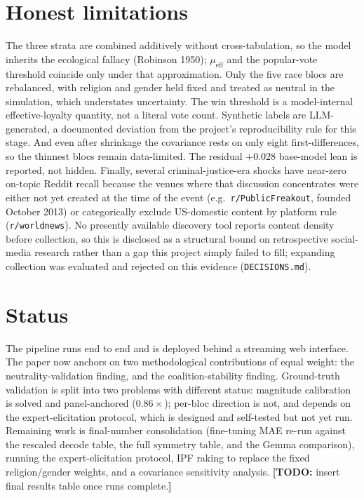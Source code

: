 \documentclass[11pt]{article}
\newcommand{\todo}[1]{{\color{red}\textbf{[TODO:} #1\textbf{]}}}
\begin{document}
\section*{Honest limitations}
The three strata are combined additively without cross-tabulation, so the model
inherits the ecological fallacy (Robinson 1950); $\mu_{\text{eff}}$ and the
popular-vote threshold coincide only under that approximation. Only the five race
blocs are rebalanced, with religion and gender held fixed and treated as neutral
in the simulation, which understates uncertainty. The win threshold is a
model-internal effective-loyalty quantity, not a literal vote count. Synthetic
labels are LLM-generated, a documented deviation from the project's
reproducibility rule for this stage. And even after shrinkage the covariance
rests on only eight first-differences, so the thinnest blocs remain data-limited.
The residual $+0.028$ base-model lean is reported, not hidden. Finally, several
criminal-justice-era shocks have near-zero on-topic Reddit recall because the
venues where that discussion concentrates were either not yet created at the
time of the event (e.g.\ \texttt{r/PublicFreakout}, founded October 2013) or
categorically exclude US-domestic content by platform rule (\texttt{r/worldnews}).
No presently available discovery tool reports content density before collection,
so this is disclosed as a structural bound on retrospective social-media
research rather than a gap this project simply failed to fill; expanding
collection was evaluated and rejected on this evidence (\texttt{DECISIONS.md}).

\section*{Status}
The pipeline runs end to end and is deployed behind a streaming web interface.
The paper now anchors on two methodological contributions of equal weight: the
neutrality-validation finding, and the coalition-stability finding. Ground-truth
validation is split into two problems with different status: magnitude
calibration is solved and panel-anchored ($0.86\times$); per-bloc direction is
not, and depends on the expert-elicitation protocol, which is designed and
self-tested but not yet run. Remaining work is final-number consolidation
(fine-tuning MAE re-run against the rescaled decode table, the full symmetry
table, and the Gemma comparison), running the expert-elicitation protocol, IPF
raking to replace the fixed religion/gender weights, and a covariance
sensitivity analysis.
\todo{insert final results table once runs complete.}
\end{document}
